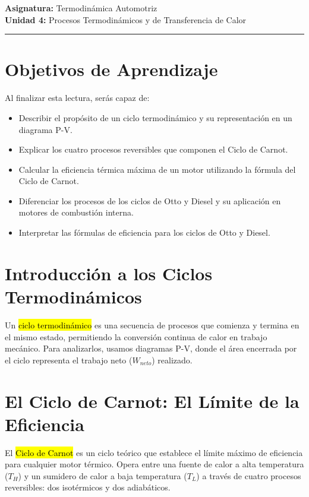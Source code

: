 \documentclass{article}
\begin{document}

\textbf{Asignatura:} Termodinámica Automotriz \\
\textbf{Unidad 4:} Procesos Termodinámicos y de Transferencia de Calor

\vspace{5mm}
\hrule
\vspace{5mm}

\section*{Objetivos de Aprendizaje}
Al finalizar esta lectura, serás capaz de:
\begin{itemize}
    \item Describir el propósito de un ciclo termodinámico y su representación en un diagrama P-V.
    \item Explicar los cuatro procesos reversibles que componen el Ciclo de Carnot.
    \item Calcular la eficiencia térmica máxima de un motor utilizando la fórmula del Ciclo de Carnot.
    \item Diferenciar los procesos de los ciclos de Otto y Diesel y su aplicación en motores de combustión interna.
    \item Interpretar las fórmulas de eficiencia para los ciclos de Otto y Diesel.
\end{itemize}

\section*{Introducción a los Ciclos Termodinámicos}

Un \hl{ciclo termodinámico} es una secuencia de procesos que comienza y termina en el mismo estado, permitiendo la conversión continua de calor en trabajo mecánico. Para analizarlos, usamos diagramas P-V, donde el área encerrada por el ciclo representa el trabajo neto ($W_{neto}$) realizado.

\section*{El Ciclo de Carnot: El Límite de la Eficiencia}

El \hl{Ciclo de Carnot} es un ciclo teórico que establece el límite máximo de eficiencia para cualquier motor térmico. Opera entre una fuente de calor a alta temperatura ($T_H$) y un sumidero de calor a baja temperatura ($T_L$) a través de cuatro procesos reversibles: dos isotérmicos y dos adiabáticos.
\end{document}
